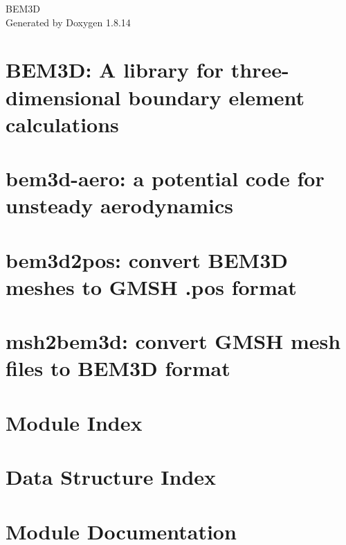 \documentclass[twoside]{book}
\newcommand{\+}{\discretionary{\mbox{\scriptsize$\hookleftarrow$}}{}{}}
\newcommand{\clearemptydoublepage}{%
  \newpage{\pagestyle{empty}\cleardoublepage}%
}
\begin{document}
\begin{titlepage}
\vspace*{7cm}
\begin{center}%
{\Large B\+E\+M3D }\\
\vspace*{1cm}
{\large Generated by Doxygen 1.8.14}\\
\end{center}
\end{titlepage}
\clearemptydoublepage
{}
\tableofcontents
\clearemptydoublepage
{}

\chapter{B\+E\+M3D\+: A library for three-\/dimensional boundary element calculations}
\label{index}
\chapter{bem3d-\/aero\+: a potential code for unsteady aerodynamics}
\label{bem3daero}

\chapter{bem3d2pos\+: convert B\+E\+M3D meshes to G\+M\+SH .pos format}
\label{bem3d2pos}

\chapter{msh2bem3d\+: convert G\+M\+SH mesh files to B\+E\+M3D format}
\label{msh2bem3d}

\chapter{Module Index}

\chapter{Data Structure Index}

\chapter{Module Documentation}























\end{document}
